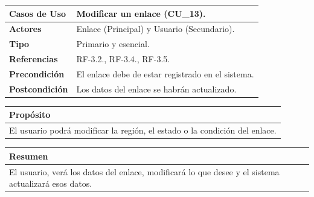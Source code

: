 \begin{itemize}
    \begin{table}[h!]
        \centering
        \begin{tabular}{|l|p{}|}
            \hline
            \textbf{Casos de Uso}   &   Modificar un enlace (CU\_13). \\
            \hline 
            \textbf{Actores}        &   Enlace (Principal) y Usuario (Secundario). \\ 
            \hline 
            \textbf{Tipo}           &   Primario y esencial. \\
            \hline
            \textbf{Referencias}    &   RF-3.2., RF-3.4., RF-3.5. \\ 
            \hline
            \textbf{Precondición}   &   El enlace debe de estar registrado en el sistema. \\ 
            \hline
            \textbf{Postcondición}  &   Los datos del enlace se habrán actualizado. \\ 
            \hline
        \end{tabular}
        
        \vspace{5mm}
        
        \begin{tabular}{|p{\textwidth}|}
            \hline
            \rowcolor{SeaGreen} \textbf{Propósito} \\
            \hline
            \multicolumn{1}{|p{12cm}|}{El usuario podrá modificar la región, el estado o la condición del enlace.} \\ [0.5ex]
            \hline
        \end{tabular}
        
        \vspace{5mm}
        
        \begin{tabular}{|p{\textwidth}|}
            \hline
            \rowcolor{SeaGreen} \textbf{Resumen} \\
            \hline
            \multicolumn{1}{|p{12cm}|}{El usuario, verá los datos del enlace, modificará lo que desee y el sistema actualizará esos datos.} \\ [0.5ex]
            \hline
        \end{tabular}
        
        \vspace{5mm}
        

\end{table}
\end{itemize}
